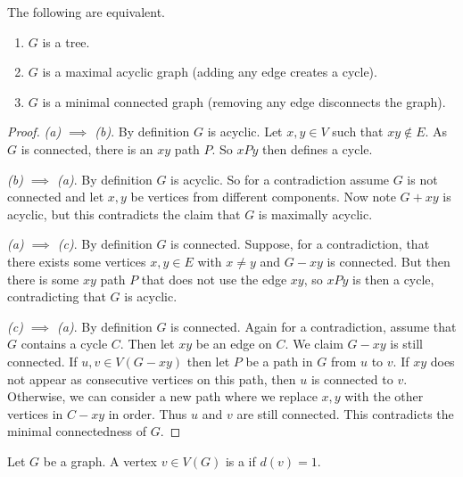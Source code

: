 \documentclass[a4paper]{scrreprt}
\begin{document}
\begin{example}
\begin{center}
\begin{tikzpicture}[x=0.75pt,y=0.75pt,yscale=-1,xscale=1]
\end{tikzpicture}

	\end{center}
\end{example}



\begin{proposition}
	The following are equivalent.
	\begin{enumerate}[label=(\alph*)]
		\item $G$ is a tree.
		\item $G$ is a maximal acyclic graph (adding any edge creates a cycle).
		\item $G$ is a minimal connected graph (removing any edge disconnects the graph).
	\end{enumerate}
\end{proposition}
\begin{proof}
	\emph{(a) $\implies$ (b)}. By definition $G$ is acyclic. Let $x, y \in V$ such that $xy \not \in E$. As $G$ is connected, there is an $xy$ path $P$. So $xPy$ then defines a cycle.

	\emph{(b) $\implies$ (a)}. By definition $G$ is acyclic. 
	So for a contradiction assume $G$ is not connected and let $x, y$ be vertices from different components. Now note $G + xy$ is acyclic, but this contradicts the claim that $G$ is maximally acyclic.

	\emph{(a) $\implies$ (c)}. By definition $G$ is connected. Suppose, for a contradiction, that there exists some vertices $x, y \in E$ with $x \neq y$ and $G - xy$ is connected. But then there is some $xy$ path $P$ that does not use the edge $xy$, so $xPy$ is then a cycle, contradicting that $G$ is acyclic.

	\emph{(c) $\implies$ (a)}. By definition $G$ is connected. Again for a contradiction, assume that $G$ contains a cycle $C$. Then let $xy$ be an edge on $C$. We claim $G - xy$ is still connected. If $u, v \in V(G - xy)$ then let $P$ be a path in $G$ from $u$ to $v$. If $xy$ does not appear as consecutive vertices on this path, then $u$ is connected to $v$. Otherwise, we can consider a new path where we replace $x,y$ with the other vertices in $C - xy$ in order. Thus $u$ and $v$ are still connected. This contradicts the minimal connectedness of $G$. 

\end{proof}

\begin{definition}[Leaf]
	Let $G$ be a graph. A vertex $v \in V(G)$ is a  if $d(v) = 1$.
\end{definition}
\end{document}
